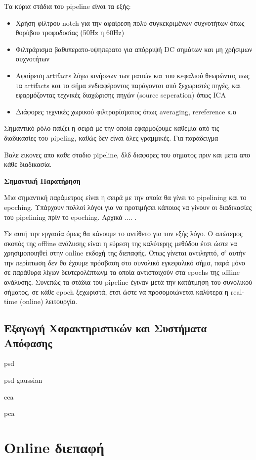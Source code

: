 \documentclass[11pt,a4paper,english,greek,twoside]{../Thesis}
\begin{document}
\par Τα κύρια στάδια του pipeline είναι τα εξής:\\
\begin{itemize}
    \item{Χρήση φίλτρου notch για την αφαίρεση πολύ συγκεκριμένων συχνοτήτων όπως θορύβου τροφοδοσίας (50Hz η 60Hz)}
    \item{Φιλτράρισμα βαθυπερατο-υψηπερατο για απόρριψή DC σημάτων και μη χρήσιμων συχνοτήτων}
    \item{Αφαίρεση artifacts λόγω κινήσεων των ματιών και του κεφαλιού θεωρώντας πως τα artifacts και το σήμα ενδιαφέροντος παράγονται από ξεχωριστές πηγές, και εφαρμόζοντας τεχνικές διαχώρισης πηγών (source seperation) όπως ICA}
    \item{Διάφορες τεχνικές χωρικού φιλτραρίσματος όπως averaging, rereference κ.α}
\end{itemize}

\par Σημαντικό ρόλο παίζει η σειρά με την οποία εφαρμόζουμε καθεμία από τις διαδικασίες του pipeling, καθώς δεν είναι όλες γραμμικές. Για παράδειγμα 
\par Βαλε εικονες απο καθε σταδιο pipeline, δλδ διαφορες του σηματος πριν και μετα απο κάθε διαδικασία.

\textbf{Σημαντική Παρατήρηση}
\par Μια σημαντική παράμετρος είναι η σειρά με την οποία θα γίνει το pipelining και το epoching. Υπάρχουν πολλοί λόγοι για να προτιμήσει κάποιος να γίνουν οι διαδικασίες του pipelining πρίν το epoching. Αρχικά .... \cite{}.
\par Σε αυτή την εργασία όμως θα κάνουμε το αντίθετο για τον εξής λόγο. Ο απώτερος σκοπός της offline ανάλυσης είναι η εύρεση της καλύτερης μεθόδου έτσι ώστε να χρησιμοποιηθεί στην online εκδοχή της διεπαφής. Όπως γίνεται αντιληπτό, σ' αυτήν την περίπτωση δεν θα έχουμε πρόσβαση στο συνολικό εγκεφαλικό σήμα, παρά μόνο σε παράθυρα λίγων δευτερολέπτωνμ τα οποία αντιστοιχούν στα epochs της offline ανάλυσης. Συνεπώς τα στάδια του pipeline έγιναν μετά την κατάτμηση του συνολικού σήματος, σε κάθε epoch ξεχωριστά, έτσι ώστε να προσομοιώνεται καλύτερα η real-time (online) λειτουργία.

\subsection{Εξαγωγή Χαρακτηριστικών και Συστήματα Απόφασης}
\label{subsec:featureExtract}
\par psd
\par psd-gaussian
\par cca
\par pca

\section{Online διεπαφή}
\end{document}
